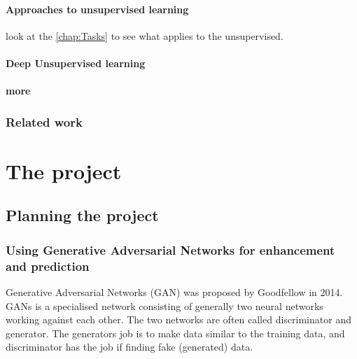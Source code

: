 \documentclass[a4paper,english]{ifimaster}
\begin{document}
\subsection{Approaches to unsupervised learning}
look at the \autoref{chap:Tasks} to see what applies to the unsupervised.

\subsection{Deep Unsupervised learning}
\subsection{more}
\section{Related work}


	      
		
		
		
		
		
		
		
		
		
		
		
		
		
		
		
		
		
		
		
		
		
		
		
		
		
\part{The project}

\chapter{Planning the project}
\section{Using Generative Adversarial Networks for enhancement and prediction}
Generative Adversarial Networks (GAN) was proposed by Goodfellow in 2014. \cite{GoodfellowGAN} %
GANs is a specialised network consisting of generally two neural networks working against each other. 
The two networks are often called discriminator and generator. The generators job is to make data similar to the training data, and discriminator has the job if finding fake (generated) data.
\end{document}
